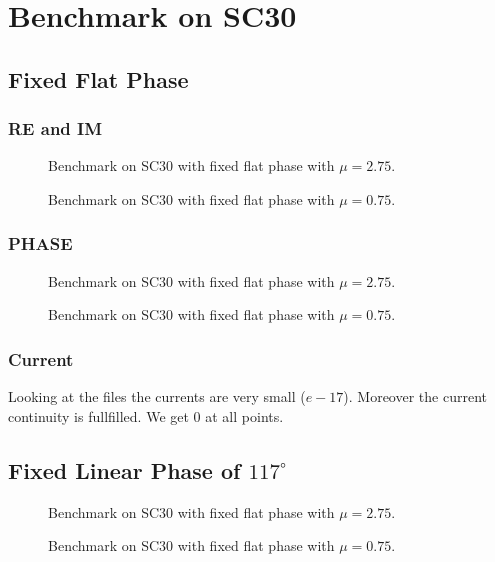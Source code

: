\documentclass[../main.tex]{subfiles}
\begin{document}
\section{Benchmark on SC30}
\subsection{Fixed Flat Phase}
\subsubsection{RE and IM}
\begin{figure}[H]
    \centering
    
    \caption{Benchmark on SC30 with fixed flat phase with $\mu = 2.75$.}
    \label{fig:sc30_fixed_flat_phase}
\end{figure}
\begin{figure}[H]
    \centering
    
    \caption{Benchmark on SC30 with fixed flat phase with $\mu = 0.75$.}
    \label{fig:sc30_fixed_flat_phase}
\end{figure}

\subsubsection{PHASE}
\begin{figure}[H]
    \centering
    
    \caption{Benchmark on SC30 with fixed flat phase with $\mu = 2.75$.}
    \label{fig:sc30_fixed_flat_phase}
\end{figure}
\begin{figure}[H]
    \centering
    
    \caption{Benchmark on SC30 with fixed flat phase with $\mu = 0.75$.}
    \label{fig:sc30_fixed_flat_phase}
\end{figure}
\subsubsection{Current}
Looking at the files the currents are very small ($e-17$). Moreover the current continuity is fullfilled. We get 0 at all points.

\subsection{Fixed Linear Phase of $117^{\circ}$} 
\begin{figure}[H]
    \centering
    
    \caption{Benchmark on SC30 with fixed flat phase with $\mu = 2.75$.}
    \label{fig:sc30_fixed_flat_phase}
\end{figure}
\begin{figure}[H]
    \centering
    
    \caption{Benchmark on SC30 with fixed flat phase with $\mu = 0.75$.}
    \label{fig:sc30_fixed_flat_phase}
\end{figure}
\end{document}
